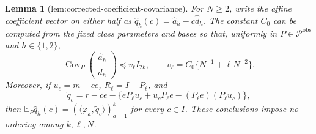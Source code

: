 \documentclass{article}
\newtheorem{lemma}{Lemma}
\begin{document}
\begin{lemma}[lem:corrected-coefficient-covariance]\label{lem:corrected-coefficient-covariance}
For \(N\ge2\), write the affine coefficient vector on either half as \(\widehat q_h(c)=\widehat a_h-c\widehat d_h\).  The constant \(C_0\) can be computed from the fixed class parameters and bases so that, uniformly in \(P\in\mathcal P^{\mathrm{obs}}\) and \(h\in\{1,2\}\),
\[
 \operatorname{Cov}_P\!\begin{pmatrix}\widehat a_h\\ \widehat d_h\end{pmatrix}
 \preceq v_\ell I_{2k},\qquad
 v_\ell=C_0\{N^{-1}+\ell N^{-2}\}.
\]
Moreover, if \(u_c=m-ce\), \(R_\ell=I-P_\ell\), and
\[
 \widetilde q_c=r-ce-\{eP_\ell u_c+u_cP_\ell e-(P_\ell e)(P_\ell u_c)\},
\]
then \(\mathbb E_P\widehat q_h(c)=(\langle\varphi_a,\widetilde q_c\rangle)_{a=1}^k\) for every \(c\in I\).  These conclusions impose no ordering among \(k,\ell,N\).
\end{lemma}
\end{document}
